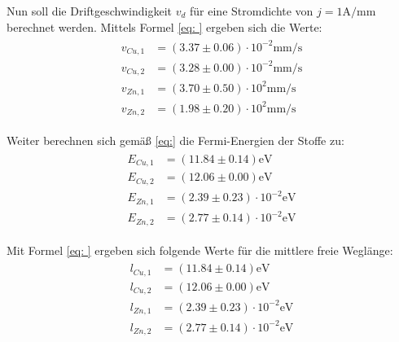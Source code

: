 Nun soll die Driftgeschwindigkeit $v_d$ für eine Stromdichte von $j = 1 \si{\ampere \per \milli \meter}$ berechnet werden. Mittels Formel
\eqref{eq: } ergeben sich die Werte:
\begin{align}
\begin{aligned}
v_{Cu,1} &= (3.37 \pm 0.06)\cdot 10^{-2}  \si{\milli\meter\per\second}  \\
v_{Cu,2} &= (3.28 \pm 0.00)\cdot 10^{-2}  \si{\milli\meter\per\second}  \\
v_{Zn,1} &= (3.70 \pm 0.50)\cdot 10^{ 2}   \si{\milli\meter\per\second} \\
v_{Zn,2} &= (1.98 \pm 0.20)\cdot 10^{ 2}   \si{\milli\meter\per\second}
\end{aligned}
\end{align}

Weiter berechnen sich gemäß \eqref{eq:} die Fermi-Energien der Stoffe zu:
\begin{align}
\begin{aligned}
E_{Cu,1} &= (11.84 \pm 0.14)  \si{\eV}  \\
E_{Cu,2} &= (12.06 \pm 0.00)  \si{\eV}  \\
E_{Zn,1} &= (2.39 \pm 0.23)\cdot 10^{-2}   \si{\eV} \\
E_{Zn,2} &= (2.77 \pm 0.14)\cdot 10^{-2}  \si{\eV}
\end{aligned}
\end{align}

Mit Formel \eqref{eq: } ergeben sich folgende Werte für die mittlere freie Weglänge:
\begin{align}
\begin{aligned}
l_{Cu,1} &= (11.84 \pm 0.14)  \si{\eV}  \\
l_{Cu,2} &= (12.06 \pm 0.00)  \si{\eV}  \\
l_{Zn,1} &= (2.39 \pm 0.23)\cdot 10^{-2}   \si{\eV} \\
l_{Zn,2} &= (2.77 \pm 0.14)\cdot 10^{-2}  \si{\eV}
\end{aligned}
\end{align}
